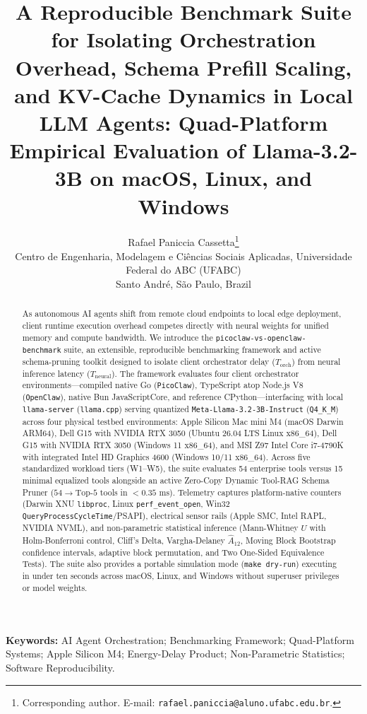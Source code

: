 \documentclass[11pt,a4paper]{article}
\title{A Reproducible Benchmark Suite for Isolating Orchestration Overhead, Schema Prefill Scaling, and KV-Cache Dynamics in Local LLM Agents: Quad-Platform Empirical Evaluation of Llama-3.2-3B on macOS, Linux, and Windows}
\author{Rafael Paniccia Cassetta\thanks{Corresponding author. E-mail: \texttt{rafael.paniccia@aluno.ufabc.edu.br}.}\\
\small Centro de Engenharia, Modelagem e Ci\^encias Sociais Aplicadas, Universidade Federal do ABC (UFABC)\\
\small Santo Andr\'e, S\~ao Paulo, Brazil}
\date{}
\begin{document}
\maketitle

\begin{abstract}
As autonomous AI agents shift from remote cloud endpoints to local edge deployment, client runtime execution overhead competes directly with neural weights for unified memory and compute bandwidth. We introduce the \texttt{picoclaw-vs-openclaw-benchmark} suite, an extensible, reproducible benchmarking framework and active schema-pruning toolkit designed to isolate client orchestrator delay ($T_{\text{orch}}$) from neural inference latency ($T_{\text{neural}}$). The framework evaluates four client orchestrator environments---compiled native Go (\texttt{PicoClaw}), TypeScript atop Node.js V8 (\texttt{OpenClaw}), native Bun JavaScriptCore, and reference CPython---interfacing with local \texttt{llama-server} (\texttt{llama.cpp}) serving quantized \texttt{Meta-Llama-3.2-3B-Instruct} (\texttt{Q4\_K\_M}) across four physical testbed environments: Apple Silicon Mac mini M4 (macOS Darwin ARM64), Dell G15 with NVIDIA RTX 3050 (Ubuntu 26.04 LTS Linux x86\_64), Dell G15 with NVIDIA RTX 3050 (Windows 11 x86\_64), and MSI Z97 Intel Core i7-4790K with integrated Intel HD Graphics 4600 (Windows 10/11 x86\_64). Across five standardized workload tiers (W1--W5), the suite evaluates 54 enterprise tools versus 15 minimal equalized tools alongside an active Zero-Copy Dynamic Tool-RAG Schema Pruner ($54 \rightarrow \text{Top-}5$ tools in $<0.35\text{ ms}$). Telemetry captures platform-native counters (Darwin XNU \texttt{libproc}, Linux \texttt{perf\_event\_open}, Win32 \texttt{QueryProcessCycleTime}/PSAPI), electrical sensor rails (Apple SMC, Intel RAPL, NVIDIA NVML), and non-parametric statistical inference (Mann-Whitney $U$ with Holm-Bonferroni control, Cliff's Delta, Vargha-Delaney $\hat{A}_{12}$, Moving Block Bootstrap confidence intervals, adaptive block permutation, and Two One-Sided Equivalence Tests). The suite also provides a portable simulation mode (\texttt{make dry-run}) executing in under ten seconds across macOS, Linux, and Windows without superuser privileges or model weights.
\end{abstract}

\noindent\textbf{Keywords:} AI Agent Orchestration; Benchmarking Framework; Quad-Platform Systems; Apple Silicon M4; Energy-Delay Product; Non-Parametric Statistics; Software Reproducibility.
\end{document}

